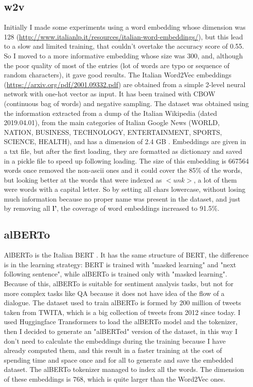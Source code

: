 \documentclass{article}
\begin{document}
        \subsection{w2v}
            Initially I made some experiments using a word embedding whose dimension was 128 (\url{http://www.italianlp.it/resources/italian-word-embeddings/}),
            but this lead to a slow and limited training, that couldn't overtake the accuracy score of 0.55.
            So I moved to a more informative embedding whose size was 300, and, although the poor quality of most of the entries
            (lot of words are typo or sequence of random characters), it gave good results.
            The Italian Word2Vec embeddings (\url{https://arxiv.org/pdf/2001.09332.pdf}) are obtained from a simple 2-level neural network with one-hot vector as input.
            It has been trained with CBOW (continuous bag of words) and negative sampling.
            The dataset was obtained using the information extracted from a
            dump of the Italian Wikipedia (dated 2019.04.01), from the main categories of Italian Google News (WORLD, NATION, BUSINESS,
            TECHNOLOGY, ENTERTAINMENT, SPORTS, SCIENCE, HEALTH), and has a dimension of 2.4 GB .
            Embeddings are given in a txt file, but after the first loading, they are formatted as dictionary and saved in a pickle file to speed up following loading.
            The size of this embedding is 667564 words once removed the non-ascii ones and it could cover the 85\% of the words, but looking better at the words that were indexed as $<unk>$, a lot of them were words with a capital letter.
            So by setting all chars lowercase, without losing much information because no proper name was present in the dataset, and just by removing all \textbf{l'},
            the coverage of word embeddings increased to 91.5\%.
        \subsection{alBERTo}\label{subsec:alberto}
            AlBERTo is the Italian BERT .
            It has the same structure of BERT, the difference is in the learning strategy: BERT is trained with "masked learning" and "next following sentence",
            while alBERTo is trained only with "masked learning".
            Because of this, alBERTo is suitable for sentiment analysis tasks, but not for more complex tasks like QA because it does not have idea of the flow of a dialogue.
            The dataset used to train alBERTo is formed by 200 million of tweets taken from TWITA, which is a big collection of tweets from 2012 since today.
            I used Huggingface Transformers to load the alBERTo model and the tokenizer, then I decided to generate an "alBERTed" version of the dataset,
            in this way I don't need to calculate the embeddings during the training because I have already computed them,
            and this result in a faster training at the cost of spending time and space once and for all to generate and save the embedded dataset.
            The alBERTo tokenizer managed to index all the words.
            The dimension of these embeddings is 768, which is quite larger than the Word2Vec ones.
\end{document}
